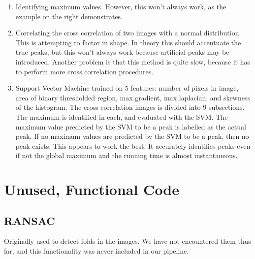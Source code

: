 \documentclass{article}
\begin{document}
\begin{enumerate}
\item Identifying maximum values. However, this won't always work, as the example on the right demonstrates.
\item Correlating the cross correlation of two images with a normal distribution. This is attempting to factor in shape. In theory this should accentuate the true peaks, but this won't always work because artificial peaks may be introduced. Another problem is that this method is quite slow, because it has to perform more cross correlation procedures. 
\item Support Vector Machine trained on 5 features: number of pixels in image, area of binary thresholded region, max gradient, max laplacian, and skewness of the histogram. The cross correlation images is divided into 9 subsections. The maximum is identified in each, and evaluated with the SVM. The maximum value predicted by the SVM to be a peak is labelled as the actual peak. If no maximum values are predicted by the SVM to be a peak, then no peak exists. This appears to work the best. It accurately identifies peaks even if not the global maximum and the running time is almost instantaneous.
\end{enumerate}

\section{Unused, Functional Code}
\subsection{RANSAC}
Originally used to detect folds in the images. We have not encountered them thus far, and this functionality was never included in our pipeline.
\end{document}
